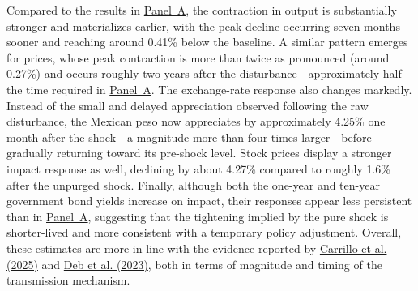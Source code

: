 \documentclass[\latexroot/\projectname]{subfiles}
\begin{document}


Compared to the results in \hyperlink{Panel BF1}{Panel~A}, the contraction in output is substantially stronger and materializes earlier, with the peak decline occurring seven months sooner and reaching around 0.41\% below the baseline. A similar pattern emerges for prices, whose peak contraction is more than twice as pronounced (around 0.27\%) and occurs roughly two years after the disturbance---approximately half the time required in \hyperlink{Panel BF1}{Panel~A}. The exchange-rate response also changes markedly. Instead of the small and delayed appreciation observed following the raw disturbance, the Mexican peso now appreciates by approximately 4.25\% one month after the shock---a magnitude more than four times larger---before gradually returning toward its pre-shock level. Stock prices display a stronger impact response as well, declining by about 4.27\% compared to roughly 1.6\% after the unpurged shock. Finally, although both the one-year and ten-year government bond yields increase on impact, their responses appear less persistent than in \hyperlink{Panel BF1}{Panel~A}, suggesting that the tightening implied by the pure shock is shorter-lived and more consistent with a temporary policy adjustment. Overall, these estimates are more in line with the evidence reported by \hyperlink{Carrillo et al. (2025)}{Carrillo et al. (2025)} and \hyperlink{Deb et al. (2023)}{Deb et al. (2023)}, both in terms of magnitude and timing of the transmission mechanism.
\end{document}
